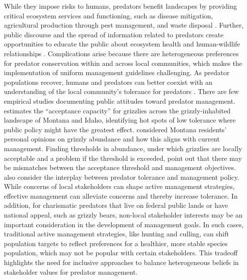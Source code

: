 \documentclass[english,12pt]{article}
\begin{document}
While they impose risks to humans, predators benefit landscapes by providing critical ecosystem services and functioning, such as disease mitigation, agricultural production through pest management, and waste disposal \citep{o2018contribution}. Further, public discourse and the spread of information related to predators create opportunities to educate the public about ecosystem health and human-wildlife relationships \citep{soga2022towards}. Complications arise because there are heterogeneous preferences for predator conservation within and across local communities, which makes the implementation of uniform management guidelines challenging. As predator populations recover, humans and predators can better coexist with an understanding of the local community’s tolerance for predators \citep{carter2012coexistence, prugh2023fear, leighton2023trophic}. There are few empirical studies documenting public attitudes toward predator management. \cite{sage_paths_2022} estimates the ``acceptance capacity'' for grizzlies across the grizzly-inhabited landscape of Montana and Idaho, identifying hot spots of low tolerance where public policy might have the greatest effect. \cite{nesbitt_human_2023} considered Montana residents' personal opinions on grizzly abundance and how this aligns with current management. Finding thresholds in abundance, under which grizzlies are locally acceptable and a problem if the threshold is exceeded, \cite{nesbitt_human_2023} point out that there may be mismatches between the acceptance threshold and management objectives. \cite{olson_changing_2024} also consider the interplay between predator tolerance and management policy. While concerns of local stakeholders can shape active management strategies, effective management can alleviate concerns and thereby increase tolerance. In addition, for charismatic predators that live on federal public lands or have national appeal, such as grizzly bears, non-local stakeholder interests may be an important consideration in the development of management goals. In such cases, traditional active management strategies, like hunting and culling, can shift population targets to reflect preferences for a healthier, more stable species population, which may not be popular with certain stakeholders. This tradeoff highlights the need for inclusive approaches to balance heterogeneous beliefs in stakeholder values for predator management.

\end{document}
